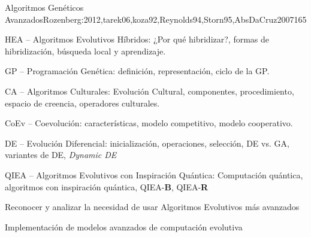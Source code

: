 \begin{syllabus}
\begin{unit}{Algoritmos Genéticos Avanzados}{Rozenberg:2012,tarek06,koza92,Reynolds94,Storn95,AbsDaCruz2007}{16}{5}
\begin{topics}
      \item HEA -- Algoritmos Evolutivos Híbridos: ¿Por qué hibridizar?, formas de hibridización, búsqueda local y aprendizaje.
      \item GP -- Programación Genética: definición, representación, ciclo de la GP. 
      \item CA -- Algoritmos Culturales: Evolución Cultural, componentes, procedimiento, espacio de creencia, operadores culturales.
      \item CoEv -- Coevolución: características, modelo competitivo, modelo cooperativo.
      \item DE -- Evolución Diferencial: inicialización, operaciones, selección, DE vs. GA, variantes de DE, {\it Dynamic DE}
      \item QIEA -- Algoritmos Evolutivos con Inspiración Quántica: Computación quántica, algoritmos con inspiración quántica, QIEA-{\bf B}, QIEA-{\bf R}
\end{topics}
\begin{unitgoals}
  \item Reconocer y analizar la necesidad de usar Algoritmos Evolutivos más avanzados
  \item Implementación de modelos avanzados de computación evolutiva
\end{unitgoals}
\end{unit}



\begin{coursebibliography}
\end{coursebibliography}

\end{syllabus}
